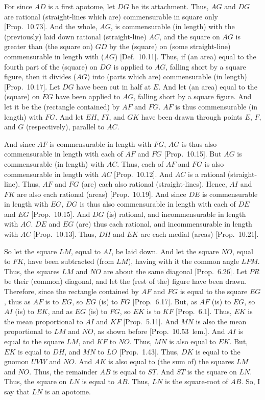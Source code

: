 For since $AD$ is a first apotome, let $DG$ be its attachment. Thus,
$AG$ and $DG$ are rational (straight-lines which are) commensurable in
square only [Prop.~10.73]. And the whole, $AG$,
is commensurable (in length) with the (previously) laid down rational (straight-line)
$AC$, and the square on $AG$ is greater than (the square on) $GD$
by the (square) on  (some straight-line) commensurable in length with ($AG$) [Def.~10.11]. Thus, if (an area) equal to the
fourth part of the (square) on $DG$ is applied to $AG$, falling short
by a square figure, then it divides ($AG$) into (parts which are) commensurable
(in length) [Prop.~10.17]. Let $DG$
have been cut in half at $E$. And let (an area) equal to the (square) on
$EG$ have been applied to $AG$, falling short by a square figure. And let
it be the (rectangle contained) by $AF$ and $FG$. $AF$ is
 thus commensurable (in length) with $FG$. And let $EH$, $FI$, and $GK$
have been drawn through points $E$, $F$, and $G$ (respectively),
parallel to $AC$.

And since $AF$ is commensurable in length with $FG$, $AG$ is thus also
commensurable in length with each of $AF$ and $FG$ [Prop.~10.15]. But $AG$ is commensurable (in length)
with $AC$. Thus, each of $AF$ and $FG$ is also commensurable in length with $AC$ 
[Prop.~10.12]. 
And $AC$ is a rational (straight-line). Thus,  $AF$ and $FG$ (are) each
also rational (straight-lines). Hence, $AI$ and
$FK$ are also each rational (areas) [Prop.~10.19]. And since $DE$ is commensurable
in length with $EG$, $DG$ is thus also commensurable
in length with each of $DE$ and $EG$ [Prop.~10.15]. And $DG$ (is) rational, and
incommensurable in length with $AC$. $DE$ and $EG$ (are) thus each
rational, and incommensurable in length with $AC$ [Prop.~10.13]. Thus, $DH$ and $EK$ are
each medial (areas) [Prop.~10.21].

So let the square $LM$, equal to $AI$, be laid down. And let the square $NO$,
equal to $FK$, have been
subtracted (from $LM$), having with it the common angle $LPM$. Thus,
the squares $LM$ and $NO$ are about the same diagonal [Prop.~6.26]. Let $PR$ be their (common) diagonal, and
let the (rest of the) figure have been drawn. Therefore, since
the rectangle contained by $AF$ and $FG$ is equal to the square $EG$,
thus as $AF$ is to $EG$, so $EG$ (is) to $FG$ [Prop.~6.17]. But, as $AF$ (is) to $EG$, so $AI$ (is)
to $EK$, and as $EG$ (is) to $FG$, so $EK$ is to $KF$ [Prop.~6.1]. Thus, $EK$ is the mean proportional
to $AI$ and $KF$ [Prop.~5.11]. And $MN$ is also the mean proportional to
$LM$ and $NO$, as shown before [Prop.~10.53~lem.].  And $AI$ is equal to the
square $LM$, and $KF$ to $NO$. Thus, $MN$ is also equal to $EK$.
But, $EK$ is equal to $DH$, and $MN$ to $LO$ [Prop.~1.43]. Thus, $DK$ is equal to the
gnomon $UVW$ and  $NO$. And $AK$ is also equal to 
(the sum of) the squares $LM$ and $NO$.  Thus, the remainder $AB$ is equal
to $ST$. And $ST$ is the square on $LN$. Thus, the square on $LN$
is equal to $AB$. Thus, $LN$ is the square-root of $AB$. So, I say that
$LN$ is an apotome.

